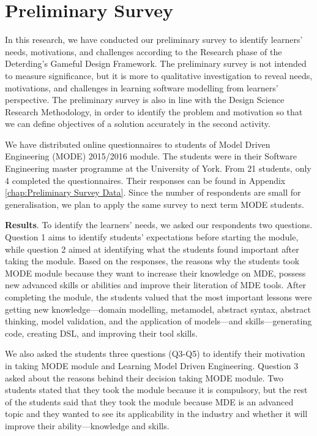 \documentclass[12pt, a4paper]{report}
\begin{document}
{\section{Preliminary Survey}
\label{Preliminary Survey}
In this research, we have conducted our preliminary survey to identify learners' needs, motivations, and challenges according to the Research phase of the Deterding's Gameful Design Framework. The preliminary survey is not intended to measure significance, but it is more to qualitative investigation to reveal needs, motivations, and challenges in learning software modelling from learners' perspective.    The preliminary survey is also in line with the Design Science Research Methodology, in order to identify the problem and motivation so that we can define objectives of a solution accurately in the second activity. 

We have distributed online questionnaires to students of Model Driven Engineering (MODE) 2015/2016 module. The students were in their Software Engineering master programme at the University of York. From 21 students, only 4 completed the questionnaires. Their responses can be found in Appendix \autoref{chap:Preliminary Survey Data}.  Since the number of respondents are small for generalisation, we plan to apply the same survey to next term MODE students. 

\textbf{Results}. To identify the learners' needs, we asked our respondents two questions. Question 1 aims to identify students' expectations before starting the module, while question 2 aimed at identifying what the students found important after taking the module. Based on the responses, the reasons why the students took MODE module because they want to increase their knowledge on MDE, possess new advanced skills or abilities and improve their literation of MDE tools. After completing the module, the students valued that the most important lessons were getting new knowledge---domain modelling, metamodel, abstract syntax, abstract thinking, model validation, and the application of models---and skills---generating code, creating DSL, and improving their tool skills. 

We also asked the students three questions (Q3-Q5) to identify their motivation in taking MODE module and Learning Model Driven Engineering. Question 3 asked about the reasons behind their decision taking MODE module. Two students stated that they took the module because it is compulsory, but the rest of the students said that they took the module because MDE is an advanced topic and they wanted to see its applicability in the industry and whether it will improve their ability---knowledge and skills. 

}
\end{document}
